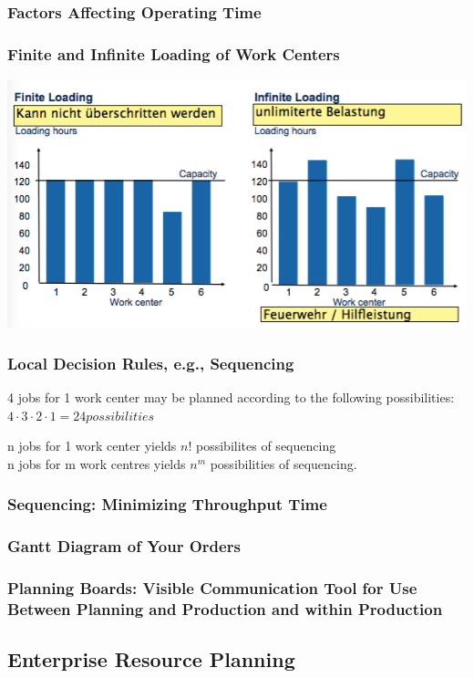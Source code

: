 \subsubsection{Factors Affecting Operating Time}
\subsubsection{Finite and Infinite Loading of Work Centers}
\includegraphics[width=1\textwidth]{W11/finitevsinfinite}
\subsubsection{Local Decision Rules, e.g., Sequencing}
4 jobs for 1 work center may be planned according to the following possibilities:
$4 \cdot 3 \cdot 2 \cdot 1 = 24 possibilities$

n jobs for 1 work center yields $n!$ possibilites of sequencing\\
n jobs for m work centres yields $n^m$ possibilities of sequencing.
\subsubsection{Sequencing: Minimizing Throughput Time}
\subsubsection{Gantt Diagram of Your Orders}
\subsubsection{Planning Boards: Visible Communication Tool for Use Between Planning and Production and within Production}
\subsection{Enterprise Resource Planning}
